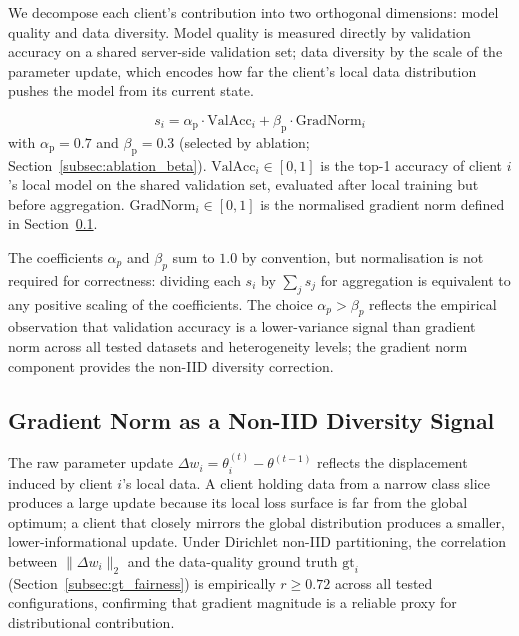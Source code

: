 \documentclass[journal]{IEEEtran}
\theoremstyle{definition}
\theoremstyle{remark}
\begin{document}
We decompose each client's contribution into two orthogonal
dimensions: model quality and data diversity.
Model quality is measured directly by validation accuracy on a
shared server-side validation set; data diversity by the scale
of the parameter update, which encodes how far the client's
local data distribution pushes the model from its current state.

\begin{equation}
  s_i = \alpha_{\mathrm{p}} \cdot \mathrm{ValAcc}_i
        + \beta_{\mathrm{p}} \cdot \mathrm{GradNorm}_i
  \label{eq:poc}
\end{equation}
with $\alpha_{\mathrm{p}} = 0.7$ and $\beta_{\mathrm{p}} = 0.3$
(selected by ablation; Section~\ref{subsec:ablation_beta}).
$\mathrm{ValAcc}_i \in [0,1]$ is the top-1 accuracy of client $i$'s
local model on the shared validation set, evaluated after local
training but before aggregation.
$\mathrm{GradNorm}_i \in [0,1]$ is the normalised gradient norm
defined in Section~\ref{subsec:gradnorm}.

The coefficients $\alpha_p$ and $\beta_p$ sum to $1.0$ by convention,
but normalisation is not required for correctness: dividing each
$s_i$ by $\sum_j s_j$ for aggregation is equivalent to any positive
scaling of the coefficients.
The choice $\alpha_p > \beta_p$ reflects the empirical observation
that validation accuracy is a lower-variance signal than gradient
norm across all tested datasets and heterogeneity levels; the
gradient norm component provides the non-IID diversity correction.

\subsection{Gradient Norm as a Non-IID Diversity Signal}
\label{subsec:gradnorm}

The raw parameter update $\Delta w_i = \theta_i^{(t)} - \theta^{(t-1)}$
reflects the displacement induced by client $i$'s local data.
A client holding data from a narrow class slice produces a large
update because its local loss surface is far from the global optimum;
a client that closely mirrors the global distribution produces a
smaller, lower-informational update.
Under Dirichlet non-IID partitioning, the correlation between
$\|\Delta w_i\|_2$ and the data-quality ground truth
$\mathrm{gt}_i$ (Section~\ref{subsec:gt_fairness}) is
empirically $r \geq 0.72$ across all tested configurations,
confirming that gradient magnitude is a reliable proxy for
distributional contribution.
\end{document}
